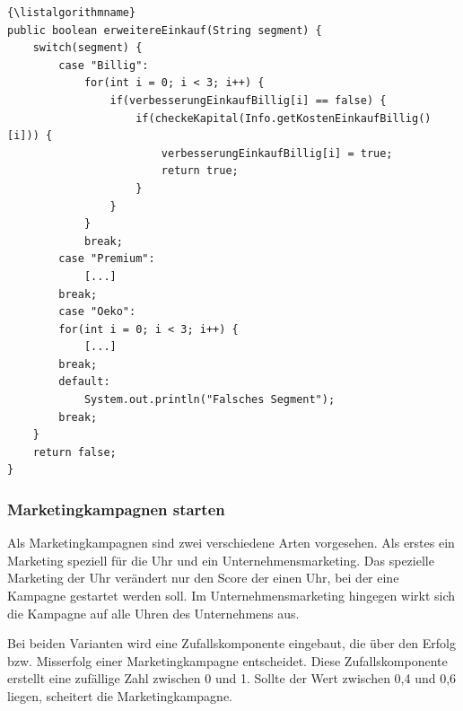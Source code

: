 \lstset{language=Java}
\begin{lstlisting}{\listalgorithmname}
public boolean erweitereEinkauf(String segment) {
	switch(segment) {
		case "Billig":
			for(int i = 0; i < 3; i++) {
				if(verbesserungEinkaufBillig[i] == false) {
					if(checkeKapital(Info.getKostenEinkaufBillig()[i])) {
						verbesserungEinkaufBillig[i] = true;
						return true;
					}
				}
			}
			break;
		case "Premium":
			[...]
		break;
		case "Oeko":
		for(int i = 0; i < 3; i++) {
			[...]
		break;
		default:
			System.out.println("Falsches Segment");
		break;
	}
	return false;
}
\end{lstlisting}

\subsubsection{Marketingkampagnen starten}
Als Marketingkampagnen sind zwei verschiedene Arten vorgesehen. Als erstes ein Marketing speziell für die Uhr und ein Unternehmensmarketing. Das spezielle Marketing der Uhr verändert nur den Score der einen Uhr, bei der eine Kampagne gestartet werden soll. Im Unternehmensmarketing hingegen wirkt sich die Kampagne auf alle Uhren des Unternehmens aus.

Bei beiden Varianten wird eine Zufallskomponente eingebaut, die über den Erfolg bzw. Misserfolg einer Marketingkampagne entscheidet. Diese Zufallskomponente erstellt eine zufällige Zahl zwischen 0 und 1. Sollte der Wert zwischen 0,4 und 0,6 liegen, scheitert die Marketingkampagne.


